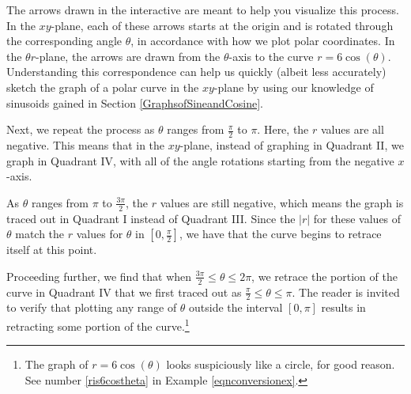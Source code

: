 \documentclass{ximera}
\begin{document}
\begin{center}
\end{center}

The arrows drawn in the interactive are meant to help you visualize this process.  In the $xy$-plane, each of these arrows starts at the origin and is rotated through the corresponding angle $\theta$, in accordance with how we plot polar coordinates. In the $\theta r$-plane, the arrows are drawn  from the $\theta$-axis to the curve $r = 6\cos(\theta)$. Understanding this correspondence can help us quickly (albeit less accurately) sketch the graph of a polar curve in the $xy$-plane by using our knowledge of sinusoids gained in Section \ref{GraphsofSineandCosine}.

Next, we repeat the process as $\theta$ ranges from $\frac{\pi}{2}$ to $\pi$.  Here, the $r$ values are all negative.  This means that in the $xy$-plane, instead of graphing in Quadrant II, we graph in Quadrant IV, with all of the angle rotations starting from the negative $x$-axis.


\begin{center}
\end{center}

\label{circletangenttoyaxis}
As $\theta$ ranges from $\pi$ to $\frac{3\pi}{2}$, the $r$ values are still negative, which means the graph is traced out in Quadrant I instead of Quadrant III. Since the $|r|$ for these values of $\theta$ match the $r$ values for $\theta$ in $\left[0, \frac{\pi}{2} \right]$, we have that the curve begins to retrace itself at this point.  


Proceeding further, we find that when $\frac{3\pi}{2} \leq \theta \leq 2\pi$, we retrace the portion of the curve in Quadrant IV that we first traced out as $\frac{\pi}{2} \leq \theta \leq \pi$. The reader is invited to verify that plotting any range of $\theta$ outside the interval $\left[ 0, \pi \right]$ results in retracting some portion of the curve.\footnote{The graph of $r=6\cos(\theta)$ looks suspiciously like a circle, for good reason. See number \ref{ris6costheta} in Example \ref{eqnconversionex}.} 

\begin{center}
\end{center}
\end{document}
